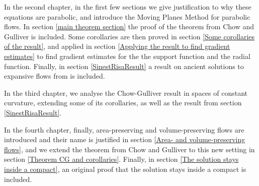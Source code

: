 In the second chapter, in the first few sections we give justification to why these equations are parabolic, and introduce the Moving Planes Method for parabolic flows. In section \ref{main theorem section} the proof of the theorem from Chow and Gulliver is included. Some corollaries are then proved in section \ref{Some corollaries of the result}, and applied in section \ref{Applying the result to find gradient estimates} to find gradient estimates for the the support function and the radial function. Finally, in section \ref{SinestRisaResult} a result on ancient solutions to expansive flows from \cite{SinestRisa} is included. 

In the third chapter, we analyse the Chow-Gulliver result in spaces of constant curvature, extending some of its corollaries, as well as the result from section \ref{SinestRisaResult}.

In the fourth chapter, finally, area-preserving and volume-preserving flows are introduced and their name is justified in section \ref{Area- and volume-preserving flows}, and we extend the theorem from Chow and Gulliver to this new setting in section \ref{Theorem CG and corollaries}. Finally, in section \ref{The solution stays inside a compact}, an original proof that the solution stays inside a compact is included.
